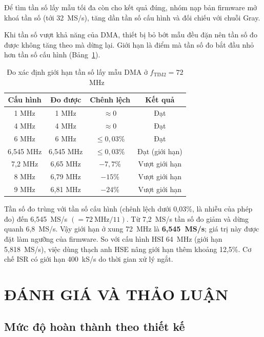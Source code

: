 Để tìm tần số lấy mẫu tối đa còn cho kết quả đúng, nhóm nạp bản firmware mở khoá tần số (tới 32~MS/s), tăng dần tần số cấu hình và đối chiếu với chuỗi Gray.

Khi tần số vượt khả năng của DMA, thiết bị bỏ bớt mẫu đều đặn nên tần số đo được không tăng theo mà dừng lại. Giới hạn là điểm mà tần số đo bắt đầu nhỏ hơn tần số cấu hình (Bảng~\ref{tab:ceiling}).

\begin{table}[H]
\centering
\caption{Đo xác định giới hạn tần số lấy mẫu DMA ở \(f_{\mathrm{TIM2}}=72\)~MHz}
\label{tab:ceiling}
\begin{tabular}{|c|c|c|c|}
\hline
Cấu hình & Đo được & Chênh lệch & Kết quả \\ \hline
1 MHz & 1 MHz & $\approx 0$ & Đạt \\ \hline
4 MHz & 4 MHz & $\approx 0$ & Đạt \\ \hline
6 MHz & 6 MHz & $\le 0{,}03\%$ & Đạt \\ \hline
6,545 MHz & 6,545 MHz & $\le 0{,}03\%$ & Đạt (giới hạn) \\ \hline
7,2 MHz & 6,65 MHz & $-7{,}7\%$ & Vượt giới hạn \\ \hline
8 MHz & 6,79 MHz & $-15\%$ & Vượt giới hạn \\ \hline
9 MHz & 6,81 MHz & $-24\%$ & Vượt giới hạn \\ \hline
\end{tabular}
\end{table}

Tần số đo trùng với tần số cấu hình (chênh lệch dưới 0,03\%, là nhiễu của phép đo) đến 6,545~MS/s \((=72~\text{MHz}/11)\). Từ 7,2~MS/s tần số đo giảm và dừng quanh 6,8~MS/s. Vậy giới hạn ở xung 72~MHz là \textbf{6,545~MS/s}; giá trị này được đặt làm ngưỡng  của firmware. So với cấu hình HSI 64~MHz (giới hạn 5,818~MS/s), việc dùng thạch anh HSE nâng giới hạn thêm khoảng 12,5\%. Cơ chế ISR có giới hạn 400~kS/s do thời gian xử lý ngắt.

\chapter{ĐÁNH GIÁ VÀ THẢO LUẬN}\label{ux111uxe1nh-giuxe1-vuxe0-thux1ea3o-luux1eadn}

\section{Mức độ hoàn thành theo thiết kế}\label{mux1ee9c-ux111ux1ed9-houxe0n-thuxe0nh-theo-thiux1ebft-kux1ebf}

